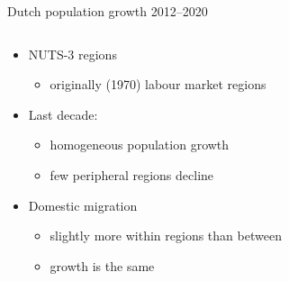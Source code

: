 \documentclass{beamer}
\begin{document}
\begin{frame}{Dutch population growth 2012--2020}
\begin{columns}
	\begin{column}{0.5\textwidth}
	\begin{itemize}
		\item NUTS-3 regions
		\begin{itemize}
			\item originally (1970) \alert{labour market} regions \newline
		\end{itemize}
		\item Last decade:
		\begin{itemize}
			\item homogeneous population growth
			\item \alert{few} peripheral regions decline\newline
		\end{itemize}
		\item Domestic migration
			\begin{itemize}
				\item slightly more \alert{within} regions than \alert{between} 
				\item growth is the \alert{same}
			\end{itemize}
	\end{itemize}
	\end{column}
	\begin{column}{0.5\textwidth}
		\begin{center}

\end{center}
\end{column}
\end{columns}
\end{frame}
\end{document}
